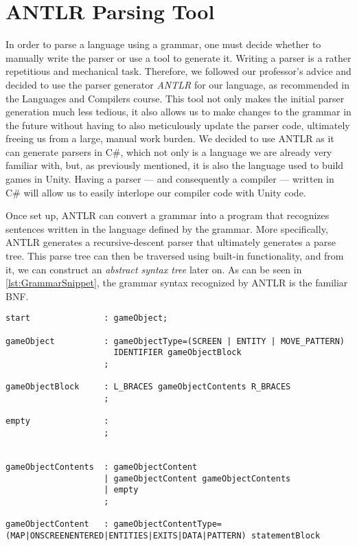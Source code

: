 \section{ANTLR Parsing Tool}\label{sec:ANTLRTool}
In order to parse a language using a grammar, one must decide whether to manually write the parser or use a tool to generate it\cite{crafting_a_compiler}.
Writing a parser is a rather repetitious and mechanical task. Therefore, we followed our professor's advice and decided to use the parser generator \textit{ANTLR} for our language, as recommended in the Languages and Compilers course. 
This tool not only makes the initial parser generation much less tedious, it also allows us to make changes to the grammar in the future without having to also meticulously update the parser code, ultimately freeing us from a large, manual work burden.
We decided to use ANTLR as it can generate parsers in C\#, which not only is a language we are already very familiar with, but, as previously mentioned, it is also the language used to build games in Unity. Having a parser — and consequently a compiler — written in C\# will allow us to easily interlope our compiler code with Unity code.


Once set up, ANTLR can convert a grammar into a program that recognizes sentences written in the language defined by the grammar.
More specifically, ANTLR generates a recursive-descent parser that ultimately generates a parse tree.
This parse tree can then be traversed using built-in functionality, and from it, we can construct an \textit{abstract syntax tree} later on.
As can be seen in \ref{lst:GrammarSnippet}, the grammar syntax recognized by ANTLR is the familiar BNF.


\begin{lstlisting}[caption={A snippet of the \dazel{} grammar used by ANTLR to generate the parser}, label={lst:GrammarSnippet}]
start				: gameObject;

gameObject          : gameObjectType=(SCREEN | ENTITY | MOVE_PATTERN) 
					  IDENTIFIER gameObjectBlock
					;
						
gameObjectBlock     : L_BRACES gameObjectContents R_BRACES
					;

empty               : 
					;


gameObjectContents  : gameObjectContent
					| gameObjectContent gameObjectContents
					| empty
					;

gameObjectContent   : gameObjectContentType=(MAP|ONSCREENENTERED|ENTITIES|EXITS|DATA|PATTERN) statementBlock 
\end{lstlisting}

